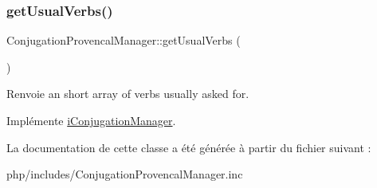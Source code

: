 \subsubsection{\texorpdfstring{get\+Usual\+Verbs()}{getUsualVerbs()}}
{\footnotesize\ttfamily Conjugation\+Provencal\+Manager\+::get\+Usual\+Verbs (\begin{DoxyParamCaption}{ }\end{DoxyParamCaption})}

\begin{DoxyReturn}{Renvoie}
an short array of verbs usually asked for. 
\end{DoxyReturn}


Implémente \hyperlink{interfaceiConjugationManager_a2a7ed39313c1c92ef5c01c88895de36e}{i\+Conjugation\+Manager}.



La documentation de cette classe a été générée à partir du fichier suivant \+:\begin{DoxyCompactItemize}
\item 
php/includes/Conjugation\+Provencal\+Manager.\+inc\end{DoxyCompactItemize}
